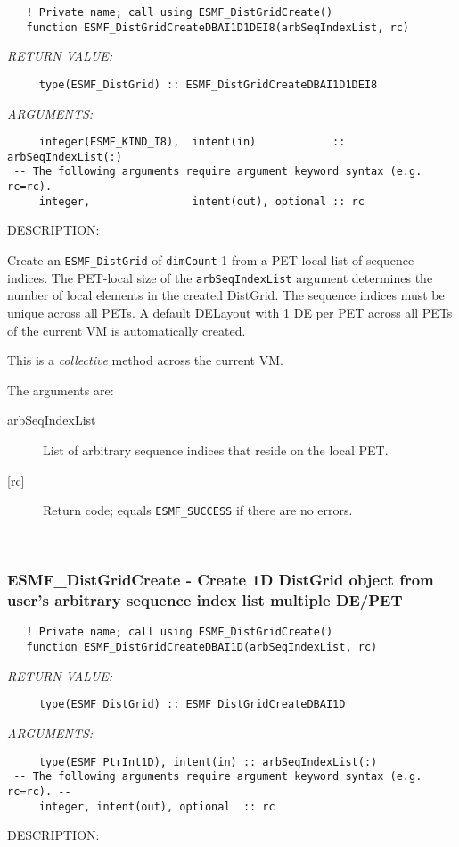  
\begin{verbatim}   ! Private name; call using ESMF_DistGridCreate()
   function ESMF_DistGridCreateDBAI1D1DEI8(arbSeqIndexList, rc)
           \end{verbatim}{\em RETURN VALUE:}
\begin{verbatim}     type(ESMF_DistGrid) :: ESMF_DistGridCreateDBAI1D1DEI8\end{verbatim}{\em ARGUMENTS:}
\begin{verbatim}     integer(ESMF_KIND_I8),  intent(in)            :: arbSeqIndexList(:)
 -- The following arguments require argument keyword syntax (e.g. rc=rc). --
     integer,                intent(out), optional :: rc\end{verbatim}
{\sf DESCRIPTION:\\ }


       Create an {\tt ESMF\_DistGrid} of {\tt dimCount} 1 from a PET-local list
       of sequence indices. The PET-local size of the {\tt arbSeqIndexList}
       argument determines the number of local elements in the created DistGrid.
       The sequence indices must be unique across all PETs. A default
       DELayout with 1 DE per PET across all PETs of the current VM is 
       automatically created.
  
       This is a {\em collective} method across the current VM.
  
       The arguments are:
       \begin{description}
       \item[arbSeqIndexList]
            List of arbitrary sequence indices that reside on the local PET.
       \item[{[rc]}]
            Return code; equals {\tt ESMF\_SUCCESS} if there are no errors.
       \end{description}
   
 
\mbox{}\hrulefill\ 
 
\subsubsection [ESMF\_DistGridCreate] {ESMF\_DistGridCreate - Create 1D DistGrid object from user's arbitrary sequence index list multiple DE/PET}


 
\begin{verbatim}   ! Private name; call using ESMF_DistGridCreate()
   function ESMF_DistGridCreateDBAI1D(arbSeqIndexList, rc)
           \end{verbatim}{\em RETURN VALUE:}
\begin{verbatim}     type(ESMF_DistGrid) :: ESMF_DistGridCreateDBAI1D\end{verbatim}{\em ARGUMENTS:}
\begin{verbatim}     type(ESMF_PtrInt1D), intent(in) :: arbSeqIndexList(:)
 -- The following arguments require argument keyword syntax (e.g. rc=rc). --
     integer, intent(out), optional  :: rc\end{verbatim}
{\sf DESCRIPTION:\\ }



